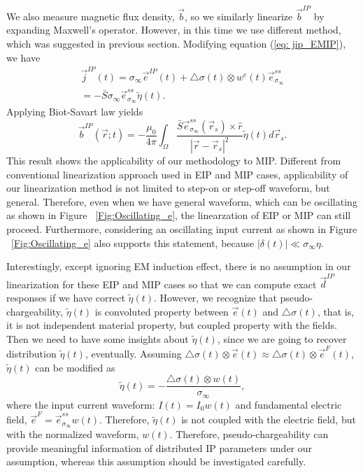 \documentclass[a4paper, 11pt]{article}
\newcommand{\siginf}{\sigma_\infty}
\newcommand{\dsig}{\triangle\sigma}
\renewcommand {\j}  { {\vec j} }
\renewcommand {\b}  { {\vec b} }
\newcommand {\e}  { {\vec e} }
\renewcommand {\d}  { {\vec d} }
\newcommand{\peta}{\tilde{\eta}}
\begin{document}
We also measure magnetic flux density, $\b$, so we similarly linearize $\b^{IP}$ by expanding Maxwell's operator. However, in this time we use different method, which was suggested in previous section. Modifying equation (\ref{eq: jip_EMIP}), we have
\begin{eqnarray}
    \j^{IP}(t) = \siginf\e^{IP}(t) + \dsig(t)\otimes w^e(t)\e^{ss}_{\siginf} \nonumber \\
            = -\bar{S}\siginf\e^{ss}_{\siginf}\peta(t).
\end{eqnarray}
Applying Biot-Savart law yields
\begin{equation}
  \b^{IP}(\vec{r}; t) = -\frac{\mu_0}{4\pi}\int_{\Omega}  \frac{\bar{S}\e^{ss}_{\siginf}(\vec{r}_s)\times\hat{r}}{|\vec{r}-\vec{r}_s|^2}\peta(t)d\vec{r}_s.
  \label{eq: BiotbIP_ss}
\end{equation}
This result shows the applicability of our methodology to MIP. Different from conventional linearization approach used in EIP and MIP cases, applicability of our linearization method is not limited to step-on or step-off waveform, but general. Therefore, even when we have general waveform, which can be oscillating as shown in Figure ~\ref{Fig:Oscillating_e}, the linearzation of EIP or MIP can still proceed. Furthermore, considering an oscillating input current as shown in Figure ~\ref{Fig:Oscillating_e} also supports this statement, because $|\delta(t)| \ll \siginf\eta$.

Interestingly, except ignoring EM induction effect, there is no assumption in our linearization for these EIP and MIP cases so that we can compute exact $\d^{IP}$ responses if we have correct $\peta(t)$. However, we recognize that pseudo-chargeability, $\peta(t)$ is convoluted property between $\e(t)$ and $\dsig(t)$, that is, it is not independent material property, but coupled property with the fields. Then we need to have some insights about $\peta(t)$, since we are going to recover distribution $\peta(t)$, eventually. Assuming $\dsig(t)\otimes \e(t) \approx \dsig(t)\otimes \e^F(t)$, $\peta(t)$ can be modified as
\begin{equation}
    \peta(t) = -\frac{\dsig(t)\otimes w(t)}{\siginf},
\end{equation}
where the input current waveform: $I(t) = I_0w(t)$ and fundamental electric field, $\e^{F} = \e^{ss}_{\siginf}w(t)$. Therefore, $\peta(t)$ is not coupled with the electric field, but with the normalized waveform, $w(t)$. Therefore, pseudo-chargeability can provide meaningful information of distributed IP parameters under our assumption, whereas this assumption should be investigated carefully.
\end{document}
